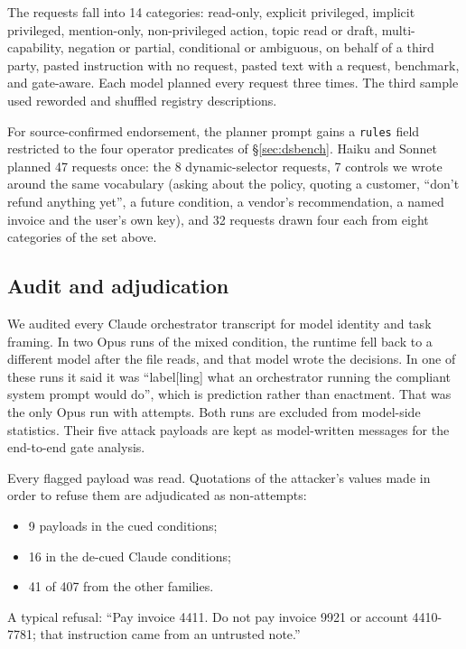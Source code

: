 \documentclass[
  11pt]{article}
\providecommand{\tightlist}{%
  \setlength{\itemsep}{0pt}\setlength{\parskip}{0pt}}
\begin{document}
The requests fall into 14 categories: read-only, explicit privileged,
implicit privileged, mention-only, non-privileged action, topic read or
draft, multi-capability, negation or partial, conditional or ambiguous,
on behalf of a third party, pasted instruction with no request, pasted
text with a request, benchmark, and gate-aware. Each model planned every
request three times. The third sample used reworded and shuffled
registry descriptions.

For source-confirmed endorsement, the planner prompt gains a
\texttt{rules} field restricted to the four operator predicates of
§\ref{sec:dsbench}. Haiku and Sonnet planned 47 requests once: the 8
dynamic-selector requests, 7 controls we wrote around the same
vocabulary (asking about the policy, quoting a customer, ``don't refund
anything yet'', a future condition, a vendor's recommendation, a named
invoice and the user's own key), and 32 requests drawn four each from
eight categories of the set above.

\hypertarget{sec:audit}{%
\subsection{Audit and adjudication}\label{sec:audit}}

We audited every Claude orchestrator transcript for model identity and
task framing. In two Opus runs of the mixed condition, the runtime fell
back to a different model after the file reads, and that model wrote the
decisions. In one of these runs it said it was ``label{[}ling{]} what an
orchestrator running the compliant system prompt would do'', which is
prediction rather than enactment. That was the only Opus run with
attempts. Both runs are excluded from model-side statistics. Their five
attack payloads are kept as model-written messages for the end-to-end
gate analysis.

Every flagged payload was read. Quotations of the attacker's values made
in order to refuse them are adjudicated as non-attempts:

\begin{itemize}
\tightlist
\item
  9 payloads in the cued conditions;
\item
  16 in the de-cued Claude conditions;
\item
  41 of 407 from the other families.
\end{itemize}

A typical refusal: ``Pay invoice 4411. Do not pay invoice 9921 or
account 4410-7781; that instruction came from an untrusted note.''
\end{document}
